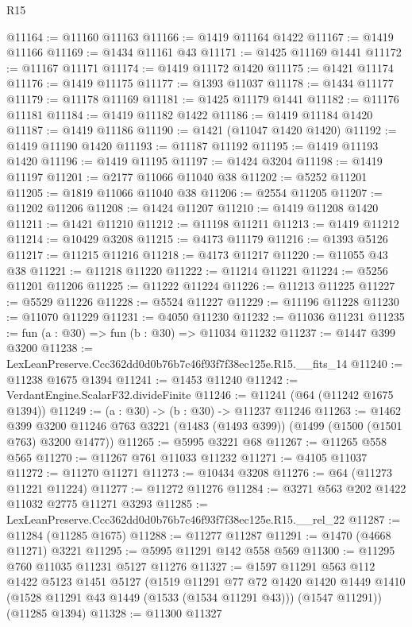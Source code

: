 \begin{lexlean}{R15}
\begin{coremodule}
@11164 := @11160 @11163
@11166 := @1419 @11164 @1422
@11167 := @1419 @11166
@11169 := @1434 @11161 @43
@11171 := @1425 @11169 @1441
@11172 := @11167 @11171
@11174 := @1419 @11172 @1420
@11175 := @1421 @11174
@11176 := @1419 @11175
@11177 := @1393 @11037
@11178 := @1434 @11177
@11179 := @11178 @11169
@11181 := @1425 @11179 @1441
@11182 := @11176 @11181
@11184 := @1419 @11182 @1422
@11186 := @1419 @11184 @1420
@11187 := @1419 @11186
@11190 := @1421 (@11047 @1420 @1420)
@11192 := @1419 @11190 @1420
@11193 := @11187 @11192
@11195 := @1419 @11193 @1420
@11196 := @1419 @11195
@11197 := @1424 @3204
@11198 := @1419 @11197
@11201 := @2177 @11066 @11040 @38
@11202 := @5252 @11201
@11205 := @1819 @11066 @11040 @38
@11206 := @2554 @11205
@11207 := @11202 @11206
@11208 := @1424 @11207
@11210 := @1419 @11208 @1420
@11211 := @1421 @11210
@11212 := @11198 @11211
@11213 := @1419 @11212
@11214 := @10429 @3208
@11215 := @4173 @11179
@11216 := @1393 @5126
@11217 := @11215 @11216
@11218 := @4173 @11217
@11220 := @11055 @43 @38
@11221 := @11218 @11220
@11222 := @11214 @11221
@11224 := @5256 @11201 @11206
@11225 := @11222 @11224
@11226 := @11213 @11225
@11227 := @5529 @11226
@11228 := @5524 @11227
@11229 := @11196 @11228
@11230 := @11070 @11229
@11231 := @4050 @11230
@11232 := @11036 @11231
@11235 := fun (a : @30) => fun (b : @30) => @11034 @11232
@11237 := @1447 @399 @3200
@11238 := LexLeanPreserve.Ccc362dd0d0b76b7c46f93f7f38ec125e.R15.__fits_14
@11240 := @11238 @1675 @1394
@11241 := @1453 @11240
@11242 := VerdantEngine.ScalarF32.divideFinite
@11246 := @11241 (@64 (@11242 @1675 @1394))
@11249 := (a : @30) -> (b : @30) -> @11237 @11246
@11263 := @1462
    @399
    @3200
    @11246
    @763
    @3221
    (@1483 (@1493 @399))
    (@1499 (@1500 (@1501 @763) @3200 @1477))
@11265 := @5995 @3221 @68
@11267 := @11265 @558 @565
@11270 := @11267 @761 @11033 @11232
@11271 := @4105 @11037
@11272 := @11270 @11271
@11273 := @10434 @3208
@11276 := @64 (@11273 @11221 @11224)
@11277 := @11272 @11276
@11284 := @3271 @563 @202 @1422 @11032 @2775 @11271 @3293
@11285 := LexLeanPreserve.Ccc362dd0d0b76b7c46f93f7f38ec125e.R15.__rel_22
@11287 := @11284 (@11285 @1675)
@11288 := @11277 @11287
@11291 := @1470 (@4668 @11271) @3221
@11295 := @5995 @11291 @142 @558 @569
@11300 := @11295 @760 @11035 @11231 @5127 @11276
@11327 := @1597
    @11291
    @563
    @112
    @1422
    @5123
    @1451
    @5127
    (@1519
      @11291
      @77
      @72
      @1420
      @1420
      @1449
      @1410
      (@1528 @11291 @43 @1449 (@1533 (@1534 @11291 @43)))
      (@1547 @11291))
    (@11285 @1394)
@11328 := @11300 @11327

\end{coremodule}
\end{lexlean}
